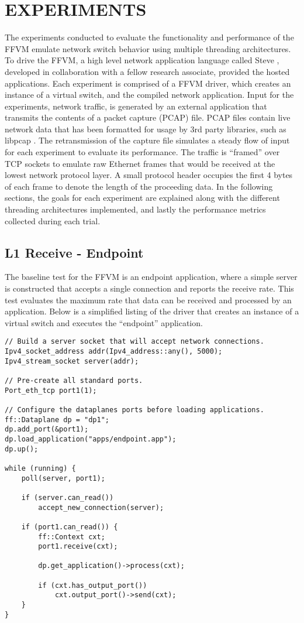 \chapter{EXPERIMENTS}
\label{expr}
The experiments conducted to evaluate the functionality and performance of
the FFVM emulate network switch behavior using multiple threading architectures.
To drive the FFVM, a high level network application language called Steve
\cite{steve}, developed in collaboration with a fellow research associate,
provided the hosted applications. Each experiment is comprised of a FFVM
driver, which creates an instance of a virtual switch, and the compiled network
application. Input for the experiments, network traffic, is generated by an
external application that transmits the contents of a packet capture (PCAP)
file. PCAP files contain live network data that has been formatted for usage
by 3rd party libraries, such as libpcap \cite{libpcap}. The retransmission of
the capture file simulates a steady flow of input for each experiment to
evaluate its performance. The traffic is ``framed'' over TCP sockets to
emulate raw Ethernet frames that would be received at the lowest network
protocol layer. A small protocol header occupies the first 4 bytes of each
frame to denote the length of the proceeding data. In the following sections,
the goals for each experiment are explained along with the different threading
architectures implemented, and lastly the performance metrics collected during
each trial.

\section{L1 Receive - Endpoint}
\label{expr:endpoint}
The baseline test for the FFVM is an endpoint application, where a simple
server is constructed that accepts a single connection and reports the
receive rate. This test evaluates the maximum rate that data can be received
and processed by an application. Below is a simplified listing of the driver
that creates an instance of a virtual switch and executes the ``endpoint''
application.

\begin{lstlisting}
// Build a server socket that will accept network connections.
Ipv4_socket_address addr(Ipv4_address::any(), 5000);
Ipv4_stream_socket server(addr);

// Pre-create all standard ports.
Port_eth_tcp port1(1);

// Configure the dataplanes ports before loading applications.
ff::Dataplane dp = "dp1";
dp.add_port(&port1);
dp.load_application("apps/endpoint.app");
dp.up();

while (running) {
	poll(server, port1);

	if (server.can_read())
		accept_new_connection(server);

	if (port1.can_read()) {
		ff::Context cxt;
		port1.receive(cxt);

		dp.get_application()->process(cxt);

		if (cxt.has_output_port())
			cxt.output_port()->send(cxt);
	}
}
\end{lstlisting}


